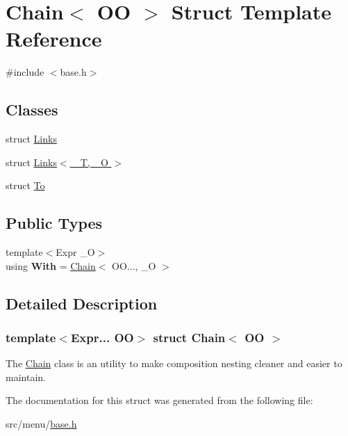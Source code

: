 \hypertarget{structChain}{}\section{Chain$<$ OO $>$ Struct Template Reference}
\label{structChain}


{\ttfamily \#include $<$base.\+h$>$}

\subsection*{Classes}
\begin{DoxyCompactItemize}
\item 
struct \hyperlink{structChain_1_1Links}{Links}
\item 
struct \hyperlink{structChain_1_1Links_3_01__T_00_01__O_01_4}{Links$<$ \+\_\+\+T, \+\_\+\+O $>$}
\item 
struct \hyperlink{structChain_1_1To}{To}
\end{DoxyCompactItemize}
\subsection*{Public Types}
\begin{DoxyCompactItemize}
\item 
\mbox{\label{structChain_a2a8c5e811335c741b02a946d82a968f8}} 
{\footnotesize template$<$Expr \+\_\+O$>$ }\\using {\bfseries With} = \hyperlink{structChain}{Chain}$<$ O\+O..., \+\_\+O $>$
\end{DoxyCompactItemize}


\subsection{Detailed Description}
\subsubsection*{template$<$Expr... OO$>$\newline
struct Chain$<$ O\+O $>$}

The \hyperlink{structChain}{Chain} class is an utility to make composition nesting cleaner and easier to maintain. 

The documentation for this struct was generated from the following file\+:\begin{DoxyCompactItemize}
\item 
src/menu/\hyperlink{base_8h}{base.\+h}\end{DoxyCompactItemize}
